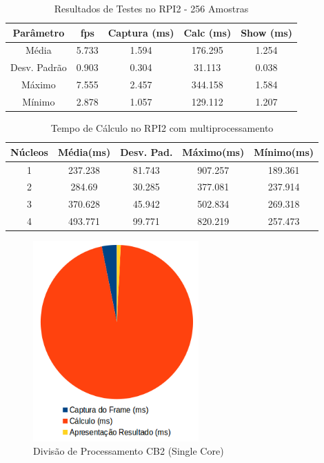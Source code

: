 \documentclass[conference]{IEEEtran}
\begin{document}
\begin{table}[h]\centering
\renewcommand{\arraystretch}{1.3}
\caption{Resultados de Testes no RPI2 - 256 Amostras}
\label{tab:table_rpi}
\begin{tabular}{|c|c|c|c|c|}

\hline
\textbf{Parâmetro} & \textbf{fps} & \textbf{Captura (ms)} & \textbf{Calc (ms)} & \textbf{Show (ms)} \\\hline \hline
Média			& 5.733 & 1.594	&	176.295	&	1.254	\\ \hline
Desv. Padrão	& 0.903 & 0.304	&	31.113	&	0.038	\\ \hline
Máximo			& 7.555 & 2.457 &	344.158	&	1.584	\\ \hline
Mínimo			& 2.878 & 1.057 &	129.112	&	1.207	\\ \hline

\end{tabular}
\end{table}

\begin{table}[h]\centering
\renewcommand{\arraystretch}{1.3}
\caption{Tempo de Cálculo no RPI2 com multiprocessamento}
\label{tab:table_rpi_cores_calc}
\begin{tabular}{|c|c|c|c|c|}

\hline
\textbf{Núcleos} & \textbf{Média(ms)} & \textbf{Desv. Pad.} & \textbf{Máximo(ms)} & \textbf{Mínimo(ms)} \\\hline \hline
1		&	237.238	&	81.743	&	907.257	&	189.361	\\ \hline
2		&	284.69	&	30.285	&	377.081	&	237.914	\\ \hline
3		&	370.628	&	45.942	&	502.834	&	269.318	\\ \hline
4		&	493.771	&	99.771	&	820.219	&	257.473	\\ \hline


\end{tabular}
\end{table}

\begin{figure}[!t]
\centering
\includegraphics[width=2.5in]{Grafico_processamento_cb2_single_core}
\caption{Divisão de Processamento CB2 (Single Core)}
\label{fig:processamento_pc}
\end{figure}
\end{document}
